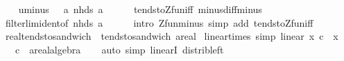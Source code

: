 \begin{isabellebody}
\ \ \isamarkupfalse%
\ {\isachardoublequoteopen}{\isacharparenleft}{\kern0pt}uminus\ {\isasymlonglongrightarrow}\ {\isacharminus}{\kern0pt}\ a{\isacharparenright}{\kern0pt}\ {\isacharparenleft}{\kern0pt}nhds\ a{\isacharparenright}{\kern0pt}{\isachardoublequoteclose}\isanewline
\ \ \ \ \isamarkupfalse%
\ tendsto{\isacharunderscore}{\kern0pt}Zfun{\isacharunderscore}{\kern0pt}iff\ minus{\isacharunderscore}{\kern0pt}diff{\isacharunderscore}{\kern0pt}minus\isanewline
\ \ \ \ \isamarkupfalse%
\ filterlim{\isacharunderscore}{\kern0pt}ident{\isacharbrackleft}{\kern0pt}of\ {\isachardoublequoteopen}nhds\ a{\isachardoublequoteclose}{\isacharbrackright}{\kern0pt}\isanewline
\ \ \ \ \isamarkupfalse%
\ {\isacharparenleft}{\kern0pt}intro\ Zfun{\isacharunderscore}{\kern0pt}minus{\isacharparenright}{\kern0pt}\ {\isacharparenleft}{\kern0pt}simp\ add{\isacharcolon}{\kern0pt}\ tendsto{\isacharunderscore}{\kern0pt}Zfun{\isacharunderscore}{\kern0pt}iff{\isacharparenright}{\kern0pt}\isanewline
{}\isamarkupfalse%
%
\endisatagproof
{\isafoldproof}%
%
\isadelimproof
\isanewline
%
\endisadelimproof
\isanewline
{}\isamarkupfalse%
\ real{\isacharunderscore}{\kern0pt}tendsto{\isacharunderscore}{\kern0pt}sandwich\ {\isacharequal}{\kern0pt}\ tendsto{\isacharunderscore}{\kern0pt}sandwich{\isacharbrackleft}{\kern0pt}\ {\isacharprime}{\kern0pt}a{\isacharequal}{\kern0pt}real{\isacharbrackright}{\kern0pt}%
\isadelimdocument
%
\endisadelimdocument
%
\isatagdocument
%
\isamarkuptrue%
%
\endisatagdocument
{\isafolddocument}%
%
\isadelimdocument
%
\endisadelimdocument
{}\isamarkupfalse%
\ linear{\isacharunderscore}{\kern0pt}times\ {\isacharbrackleft}{\kern0pt}simp{\isacharbrackright}{\kern0pt}{\isacharcolon}{\kern0pt}\ {\isachardoublequoteopen}linear\ {\isacharparenleft}{\kern0pt}{\isasymlambda}x{\isachardot}{\kern0pt}\ c\ {\isacharasterisk}{\kern0pt}\ x{\isacharparenright}{\kern0pt}{\isachardoublequoteclose}\isanewline
\ \ \ c\ {\isacharcolon}{\kern0pt}{\isacharcolon}{\kern0pt}\ {\isachardoublequoteopen}{\isacharprime}{\kern0pt}a{\isacharcolon}{\kern0pt}{\isacharcolon}{\kern0pt}real{\isacharunderscore}{\kern0pt}algebra{\isachardoublequoteclose}\isanewline
%
\isadelimproof
\ \ %
\endisadelimproof
%
\isatagproof
{}\isamarkupfalse%
\ {\isacharparenleft}{\kern0pt}auto\ simp{\isacharcolon}{\kern0pt}\ linearI\ distrib{\isacharunderscore}{\kern0pt}left{\isacharparenright}{\kern0pt}%

\end{isabellebody}
